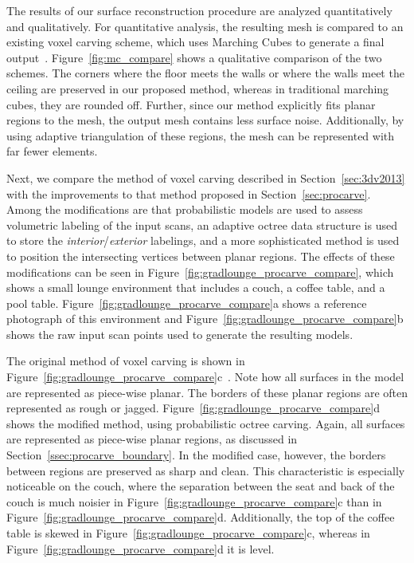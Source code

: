\documentclass[12pt,onecolumn,oneside]{book}
\begin{document}
The results of our surface reconstruction procedure are analyzed quantitatively and qualitatively.  For quantitative analysis, the resulting mesh is compared to an existing voxel carving scheme, which uses Marching Cubes to generate a final output~\cite{Carving}.  Figure~\ref{fig:mc_compare} shows a qualitative comparison of the two schemes.  The corners where the floor meets the walls or where the walls meet the ceiling are preserved in our proposed method, whereas in traditional marching cubes, they are rounded off.  Further, since our method explicitly fits planar regions to the mesh, the output mesh contains less surface noise.  Additionally, by using adaptive triangulation of these regions, the mesh can be represented with far fewer elements.

Next, we compare the method of voxel carving described in Section~\ref{sec:3dv2013} with the improvements to that method proposed in Section~\ref{sec:procarve}.  Among the modifications are that probabilistic models are used to assess volumetric labeling of the input scans, an adaptive octree data structure is used to store the {\it interior}/{\it exterior} labelings, and a more sophisticated method is used to position the intersecting vertices between planar regions.  The effects of these modifications can be seen in Figure~\ref{fig:gradlounge_procarve_compare}, which shows a small lounge environment that includes a couch, a coffee table, and a pool table.  Figure~\ref{fig:gradlounge_procarve_compare}a shows a reference photograph of this environment and Figure~\ref{fig:gradlounge_procarve_compare}b shows the raw input scan points used to generate the resulting models.  

The original method of voxel carving is shown in Figure~\ref{fig:gradlounge_procarve_compare}c~\cite{Turner13}.  Note how all surfaces in the model are represented as piece-wise planar.  The borders of these planar regions are often represented as rough or jagged.  Figure~\ref{fig:gradlounge_procarve_compare}d shows the modified method, using probabilistic octree carving.  Again, all surfaces are represented as piece-wise planar regions, as discussed in Section~\ref{ssec:procarve_boundary}.  In the modified case, however, the borders between regions are preserved as sharp and clean.  This characteristic is especially noticeable on the couch, where the separation between the seat and back of the couch is much noisier in Figure~\ref{fig:gradlounge_procarve_compare}c than in Figure~\ref{fig:gradlounge_procarve_compare}d.  Additionally, the top of the coffee table is skewed in Figure~\ref{fig:gradlounge_procarve_compare}c, whereas in Figure~\ref{fig:gradlounge_procarve_compare}d it is level.
\end{document}
